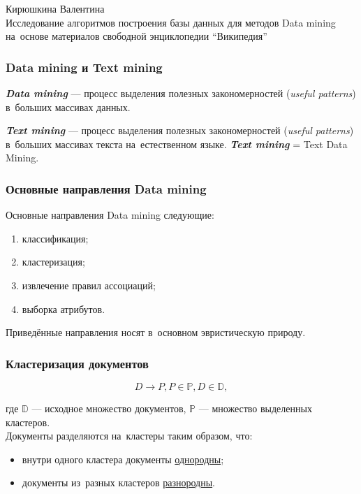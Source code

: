 \documentclass{beamer}
\newcommand{\MARK}[1]{{\bf {\it #1}}}
\begin{document}
\sloppy

\begin{frame}
\begin{center}
Кирюшкина Валентина\\
\vspace{1cm}
{\Large Исследование алгоритмов построения базы данных для методов Data mining\\
на~основе материалов свободной энциклопедии ``Википедия''}
\end{center}
\end{frame}

\begin{frame}
\frametitle{Data mining и Text mining}
\MARK{Data mining} --- процесс выделения полезных закономерностей ({\it useful patterns})  
в~больших массивах данных.

\vspace{1cm}

\MARK{Text mining} --- процесс выделения полезных закономерностей ({\it useful patterns})  
в~больших массивах текста на~естественном языке.
\MARK{Text mining} = Text Data Mining.
\end{frame}

\begin{frame}
\frametitle{Основные направления Data mining}

Основные направления Data mining следующие:

\begin{enumerate}
\item{классификация;}
\item{кластеризация;}
\item{извлечение правил ассоциаций;}
\item{выборка атрибутов.}
\end{enumerate}

Приведённые направления носят в~основном эвристическую природу.
\end{frame}

\begin{frame}
\frametitle{Кластеризация документов}
$$D \to P, P \in \mathbb{P}, D \in \mathbb{D},$$

\vspace{1cm}

где $\mathbb{D}$ --- исходное множество документов, $\mathbb{P}$ --- множество выделенных кластеров.\\
Документы разделяются на~кластеры таким образом, что:

\begin{itemize}
\item{внутри одного кластера документы \underline{однородны};}
\item{документы из~разных кластеров \underline{разнородны}.}
\end{itemize}
\vspace{1cm}
\end{frame}
\end{document}
